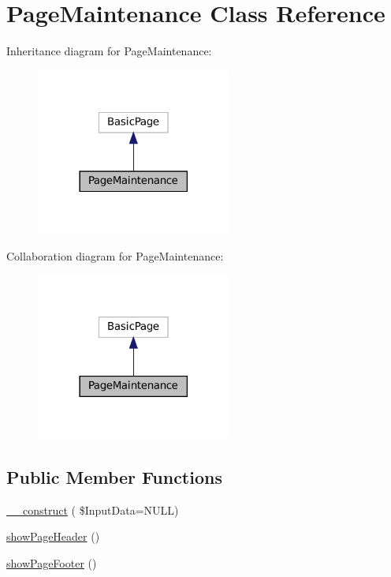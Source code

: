 \hypertarget{class_page_maintenance}{}\section{Page\+Maintenance Class Reference}
\label{class_page_maintenance}


Inheritance diagram for Page\+Maintenance\+:\nopagebreak
\begin{figure}[H]
\begin{center}
\leavevmode
\includegraphics[width=182pt]{class_page_maintenance__inherit__graph}
\end{center}
\end{figure}


Collaboration diagram for Page\+Maintenance\+:\nopagebreak
\begin{figure}[H]
\begin{center}
\leavevmode
\includegraphics[width=182pt]{class_page_maintenance__coll__graph}
\end{center}
\end{figure}
\subsection*{Public Member Functions}
\begin{DoxyCompactItemize}
\item 
\hyperlink{class_page_maintenance_a2a5e95018231b6fafd22b03678eaad4f}{\+\_\+\+\_\+construct} ( \$Input\+Data=N\+U\+LL)
\item 
\hyperlink{class_page_maintenance_a33a8d59dd6e8fe5d7fbc3f24ada425c7}{show\+Page\+Header} ()
\item 
\hyperlink{class_page_maintenance_aa48915beae65efb4ea5ab03d3c7c618c}{show\+Page\+Footer} ()
\end{DoxyCompactItemize}
